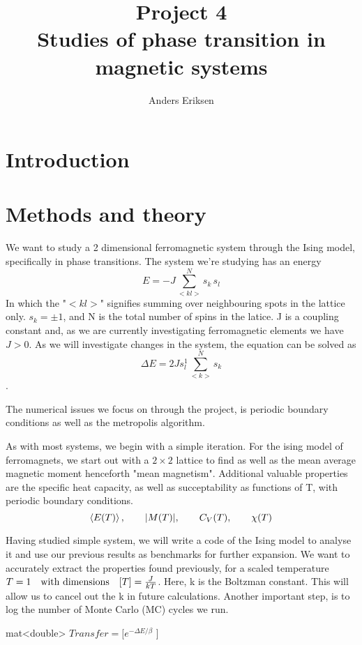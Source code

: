 \documentclass[10pt, twocolumn]{revtex4-1}
\begin{document}
\title{%
    Project 4\\
    \large Studies of phase transition in magnetic systems}
\author{Anders Eriksen}
\begin{abstract}
\end{abstract}
\maketitle

\section{Introduction}


\section{Methods and theory}

We want to study a 2 dimensional ferromagnetic system through the Ising model, specifically in phase transitions.
The system we're studying has an energy
\[ E = -J \sum_{<kl>}^N s_k \, s_l \]
In which the "$<kl>$" signifies summing over neighbouring spots in the lattice only. $s_k = \pm 1$, and N is the total number of spins in
the latice. J is a coupling constant and, as we are currently investigating ferromagnetic elements we have $J > 0$.
As we will investigate changes in the system, the equation can be solved as
\[ \Delta E = 2 Js_l^1 \sum_{<k>}^N s_k \].

The numerical issues we focus on through the project, is periodic boundary conditions as well as the metropolis algorithm. %

As with most systems, we begin with a simple iteration. For the ising model of ferromagnets, we start out with a $2\times 2$ lattice to find
as well as the mean average magnetic moment henceforth "mean magnetism". Additional valuable properties are the specific heat capacity,
as well as succeptability as functions of T, with periodic boundary conditions.
\[
    \ev{E(T)}, \qq{} \abs{M(T)}, \qq{} C_V(T), \qq{} \chi(T)
\] %

Having studied simple system, we will write a code of the Ising model to analyse it and use our previous results as benchmarks for further expansion. We
want to accurately extract the properties found previously, for a scaled temperature $T = 1 \qq{with dimensions} \qty[ T ] = \frac{ J }{ kT }$. Here,
k is the Boltzman constant. This will allow us to cancel out the k in future calculations. Another important step, is to log the number of Monte Carlo
(MC) cycles we run.
\begin{algorithm}
    mat<double> $Transfer = [ e^{-\Delta E/ \beta }$ ]\;
    \caption{}
\end{algorithm}
\end{document}
